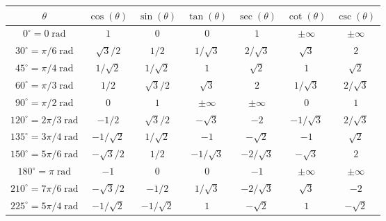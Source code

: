 \documentclass{article}
\begin{document}
\begin{tabular}{|c||c|c||c|c||c|c|}
\hline
\(\theta\)                                           & \(\cos(\theta)\) & \(\sin(\theta)\) & \(\tan(\theta)\) & \(\sec(\theta)\) & \(\cot(\theta)\) & \(\csc(\theta)\) \\
\hline
\hline
\(0^\circ = 0\;\text{rad}\)               & \(1\)                  & \(0\)                    & \(0\)                  & \(1\)                & \(\pm\infty\)     & \(\pm\infty\)  \\
\hline
\(30^\circ = \pi/6\;\text{rad}\)        & \(\sqrt{3}/2\)    & \(1/2\)                & \(1/\sqrt{3}\)    & \(2/\sqrt{3}\)  & \(\sqrt{3}\)      & \(2\)              \\
\hline 
\(45^\circ = \pi/4\;\text{rad}\)        & \(1/\sqrt{2}\)    & \(1/\sqrt{2}\)     & \(1\)                  & \(\sqrt{2}\)      & \(1\)                & \(\sqrt{2}\)    \\
\hline
\(60^\circ = \pi/3\;\text{rad}\)        & \(1/2\)               & \(\sqrt{3}/2\)     & \(\sqrt{3}\)       & \(2\)                 & \(1/\sqrt{3}\)  & \(2/\sqrt{3}\) \\
\hline
\(90^\circ = \pi/2\;\text{rad}\)        & \(0\)                  & \(1\)                    & \(\pm\infty\)     & \(\pm\infty\)     & \(0\)                 & \(1\)               \\
\hline
\(120^\circ = 2\pi/3\;\text{rad}\)    & \(-1/2\)             & \(\sqrt{3}/2\)      & \(-\sqrt{3}\)     & \(-2\)                & \(-1/\sqrt{3}\) & \(2/\sqrt{3}\) \\
\hline
\(135^\circ = 3\pi/4\;\text{rad}\)    & \(-1/\sqrt{2}\)  & \(1/\sqrt{2}\)      & \(-1\)                & \(-\sqrt{2}\)     & \(-1\)               & \(\sqrt{2}\)     \\
\hline
\(150^\circ = 5\pi/6\;\text{rad}\)    & \(-\sqrt{3}/2\) & \(1/2\)                 & \(-1/\sqrt{3}\)  & \(-2/\sqrt{3}\) & \(-\sqrt{3}\)    & \(2\)                \\
\hline
\(180^\circ = \pi\;\text{rad}\)         & \(-1\)                 & \(0\)                    & \(0\)                 & \(-1\)                & \(\pm\infty\)    & \(\pm\infty\)   \\
\hline
\(210^\circ = 7\pi/6\;\text{rad}\)   & \(-\sqrt{3}/2\)   & \(-1/2\)               & \(1/\sqrt{3}\)  & \(-2/\sqrt{3}\)  & \(\sqrt{3}\)      & \(-2\)              \\
\hline 
\(225^\circ = 5\pi/4\;\text{rad}\)   & \(-1/\sqrt{2}\)   & \(-1/\sqrt{2}\)    & \(1\)                 & \(-\sqrt{2}\)     & \(1\)                & \(-\sqrt{2}\)    \\

\end{tabular}
\end{document}
